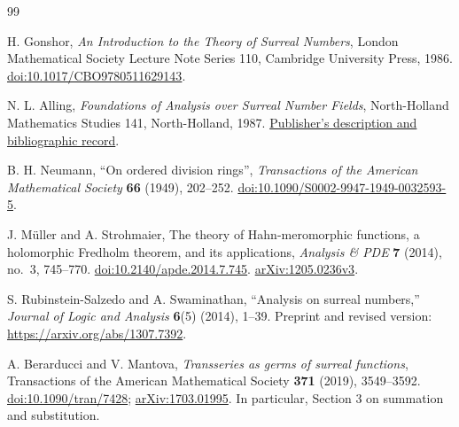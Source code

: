 \documentclass[11pt,a4paper]{article}
\numberwithin{equation}{section}
\theoremstyle{definition}
\theoremstyle{remark}
\theoremstyle{plain}
\newcommand{\arxiv}[1]{\href{https://arxiv.org/abs/#1}{arXiv:#1}}
\begin{document}
\begin{thebibliography}{99}


H. Gonshor, \emph{An Introduction to the Theory of Surreal Numbers}, London Mathematical Society Lecture Note Series 110, Cambridge University Press, 1986. \href{https://doi.org/10.1017/CBO9780511629143}{doi:10.1017/CBO9780511629143}.

N. L. Alling, \emph{Foundations of Analysis over Surreal Number Fields}, North-Holland Mathematics Studies 141, North-Holland, 1987. \href{https://shop.elsevier.com/books/foundations-of-analysis-over-surreal-number-fields/alling/978-0-444-70226-5}{Publisher's description and bibliographic record}.

B. H. Neumann, ``On ordered division rings'', \emph{Transactions of the American Mathematical Society} \textbf{66} (1949), 202--252. \href{https://doi.org/10.1090/S0002-9947-1949-0032593-5}{doi:10.1090/S0002-9947-1949-0032593-5}.

J. M\"uller and A. Strohmaier, The theory of Hahn-meromorphic functions, a holomorphic Fredholm theorem, and its applications, \emph{Analysis \& PDE} \textbf{7} (2014), no.~3, 745--770. \href{https://doi.org/10.2140/apde.2014.7.745}{doi:10.2140/apde.2014.7.745}. \href{https://arxiv.org/abs/1205.0236v3}{arXiv:1205.0236v3}.

S. Rubinstein-Salzedo and A. Swaminathan, ``Analysis on surreal numbers,'' \emph{Journal of Logic and Analysis} \textbf{6}(5) (2014), 1--39. Preprint and revised version: \url{https://arxiv.org/abs/1307.7392}.

A. Berarducci and V. Mantova, \emph{Transseries as germs of surreal functions}, Transactions of the American Mathematical Society \textbf{371} (2019), 3549--3592. \href{https://doi.org/10.1090/tran/7428}{doi:10.1090/tran/7428}; \arxiv{1703.01995}. In particular, Section 3 on summation and substitution.


\end{thebibliography}
\end{document}
